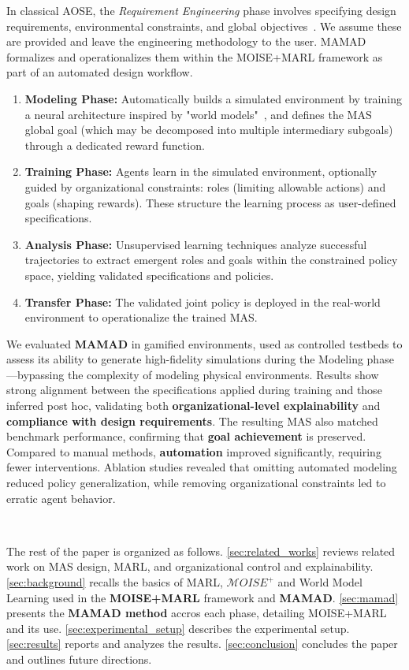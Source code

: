 \documentclass[pdflatex,sn-mathphys-num]{sn-jnl}%
\theoremstyle{thmstyleone}%
\theoremstyle{thmstyletwo}%
\theoremstyle{thmstylethree}%
\begin{document}
In classical AOSE, the \textit{Requirement Engineering} phase involves specifying design requirements, environmental constraints, and global objectives~\cite{Pavon2003, Bernon2005}. We assume these are provided and leave the engineering methodology to the user. MAMAD formalizes and operationalizes them within the MOISE+MARL framework as part of an automated design workflow.

\begin{enumerate}
    \item \textbf{Modeling Phase:} Automatically builds a simulated environment by training a neural architecture inspired by "world models"~\cite{Ha2018}, and defines the MAS global goal (which may be decomposed into multiple intermediary subgoals) through a dedicated reward function.
    \item \textbf{Training Phase:} Agents learn in the simulated environment, optionally guided by organizational constraints: roles (limiting allowable actions) and goals (shaping rewards). These structure the learning process as user-defined specifications.
    \item \textbf{Analysis Phase:} Unsupervised learning techniques analyze successful trajectories to extract emergent roles and goals within the constrained policy space, yielding validated specifications and policies.
    \item \textbf{Transfer Phase:} The validated joint policy is deployed in the real-world environment to operationalize the trained MAS.
\end{enumerate}

We evaluated \textbf{MAMAD} in gamified environments, used as controlled testbeds to assess its ability to generate high-fidelity simulations during the Modeling phase—bypassing the complexity of modeling physical environments. Results show strong alignment between the specifications applied during training and those inferred post hoc, validating both \textbf{organizational-level explainability} and \textbf{compliance with design requirements}. The resulting MAS also matched benchmark performance, confirming that \textbf{goal achievement} is preserved. Compared to manual methods, \textbf{automation} improved significantly, requiring fewer interventions. Ablation studies revealed that omitting automated modeling reduced policy generalization, while removing organizational constraints led to erratic agent behavior.

\

The rest of the paper is organized as follows. \autoref{sec:related_works} reviews related work on MAS design, MARL, and organizational control and explainability. \autoref{sec:background} recalls the basics of MARL, $\mathcal{M}OISE^+$ and World Model Learning used in the \textbf{MOISE+MARL} framework and \textbf{MAMAD}. \autoref{sec:mamad} presents the \textbf{MAMAD method} accros each phase, detailing MOISE+MARL and its use. \autoref{sec:experimental_setup} describes the experimental setup. \autoref{sec:results} reports and analyzes the results. \autoref{sec:conclusion} concludes the paper and outlines future directions.
\end{document}
